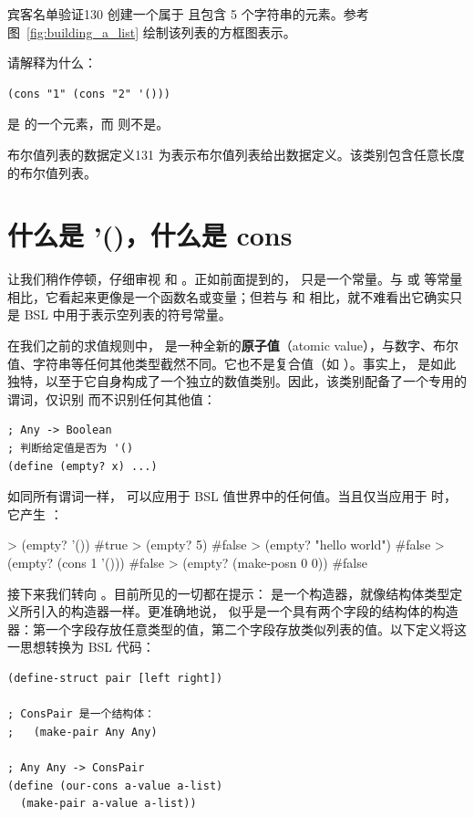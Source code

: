 \begin{exercise}{宾客名单验证}{130}
创建一个属于  且包含 5 个字符串的元素。参考图~\ref{fig:building_a_list} 绘制该列表的方框图表示。

请解释为什么：
\begin{lstlisting}[language=BSL]
(cons "1" (cons "2" '()))
\end{lstlisting}
是  的一个元素，而  则不是。
\end{exercise}

\begin{exercise}{布尔值列表的数据定义}{131}
为表示布尔值列表给出数据定义。该类别包含任意长度的布尔值列表。
\end{exercise}

\section{什么是 '()，什么是 cons}
\label{sec:ch08_what_is_empty_and_cons}

让我们稍作停顿，仔细审视  和 。正如前面提到的， 只是一个常量。与  或  等常量相比，它看起来更像是一个函数名或变量；但若与  和  相比，就不难看出它确实只是 BSL 中用于表示空列表的符号常量。

在我们之前的求值规则中， 是一种全新的\textbf{原子值}（atomic value），与数字、布尔值、字符串等任何其他类型截然不同。它也不是复合值（如 ）。事实上， 是如此独特，以至于它自身构成了一个独立的数值类别。因此，该类别配备了一个专用的谓词，仅识别  而不识别任何其他值：
\begin{lstlisting}[language=BSL]
; Any -> Boolean
; 判断给定值是否为 '()
(define (empty? x) ...)
\end{lstlisting}

如同所有谓词一样， 可以应用于 BSL 值世界中的任何值。当且仅当应用于  时，它产生 ：
\begin{replbox}
> (empty? '())
#true
> (empty? 5)
#false
> (empty? "hello world")
#false
> (empty? (cons 1 '()))
#false
> (empty? (make-posn 0 0))
#false
\end{replbox}

接下来我们转向 。目前所见的一切都在提示： 是一个构造器，就像结构体类型定义所引入的构造器一样。更准确地说， 似乎是一个具有两个字段的结构体的构造器：第一个字段存放任意类型的值，第二个字段存放类似列表的值。以下定义将这一思想转换为 BSL 代码：
\begin{lstlisting}[language=BSL]
(define-struct pair [left right])

; ConsPair 是一个结构体：
;   (make-pair Any Any)

; Any Any -> ConsPair
(define (our-cons a-value a-list)
  (make-pair a-value a-list))
\end{lstlisting}

